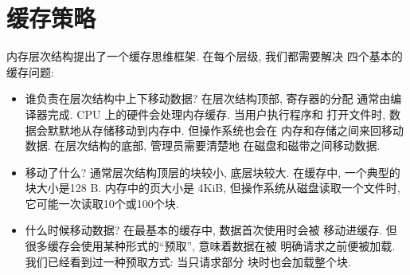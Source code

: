 \documentclass[12pt]{book}
\begin{document}
{\section{缓存策略}

内存层次结构提出了一个缓存思维框架. 在每个层级, 我们都需要解决
四个基本的缓存问题: 

\begin{itemize}

\item 谁负责在层次结构中上下移动数据? 在层次结构顶部, 寄存器的分配
通常由编译器完成. CPU 上的硬件会处理内存缓存. 当用户执行程序和
打开文件时, 数据会默默地从存储移动到内存中. 但操作系统也会在
内存和存储之间来回移动数据. 在层次结构的底部, 管理员需要清楚地
在磁盘和磁带之间移动数据.

\item 移动了什么? 通常层次结构顶层的块较小, 底层块较大.
在缓存中, 一个典型的块大小是128 B. 内存中的页大小是 4KiB, 
但操作系统从磁盘读取一个文件时,  它可能一次读取10个或100个块.

\item 什么时候移动数据? 在最基本的缓存中, 数据首次使用时会被
移动进缓存. 但很多缓存会使用某种形式的``预取'', 意味着数据在被
明确请求之前便被加载. 我们已经看到过一种预取方式: 当只请求部分
块时也会加载整个块. 


\end{itemize}}
\end{document}
